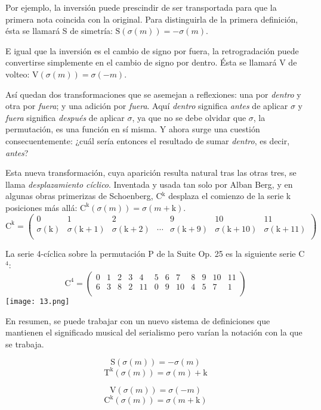 		Por ejemplo, la inversión puede prescindir de ser transportada para que la primera nota coincida con la original. Para distinguirla de la primera definición, ésta se llamará S de simetría: $\text{S}(\sigma(m)) = -\sigma(m)$.
		
		E igual que la inversión es el cambio de signo por fuera, la retrogradación puede convertirse simplemente en el cambio de signo por dentro. Ésta se llamará V de volteo: $\text{V}(\sigma(m)) = \sigma(-m)$.
		
		Así quedan dos transformaciones que se asemejan a reflexiones: una por \textit{dentro} y otra por \textit{fuera}; y una adición por \textit{fuera}. Aquí \textit{dentro} significa \textit{antes} de aplicar $\sigma$ y \textit{fuera} significa \textit{después} de aplicar $\sigma$, ya que no se debe olvidar que $\sigma$, la permutación, es una función en sí misma. Y ahora surge una cuestión consecuentemente: ¿cuál sería entonces el resultado de sumar \textit{dentro}, es decir, \textit{antes}?
		
		Esta nueva transformación, cuya aparición resulta natural tras las otras tres, se llama \textit{desplazamiento cíclico}. Inventada y usada tan solo por Alban Berg, y en algunas obras primerizas de Schoenberg, C$^\text{k}$ desplaza el comienzo de la serie k posiciones más allá: $\text{C}^\text{k}\left(\sigma\left(m\right)\right)=\sigma\left(m+\text{k}\right)$.
		$$\text{C}^\text{k}=\left(\begin{matrix}0&1&2&&9&10&11\\\sigma\left(\text{k}\right)&\sigma\left(\text{k}+1\right)&\sigma\left(\text{k}+2\right)&\cdots&\sigma\left(\text{k}+9\right)&\sigma\left(\text{k}+10\right)&\sigma\left(\text{k}+11\right)\\\end{matrix}\right)$$
		
		La serie 4-cíclica sobre la permutación P de la Suite Op. 25 es la siguiente serie C$^4$:	
		$$\text{C}^4=\left(\begin{matrix}0&1&2&3&4&5&6&7&8&9&10&11\\6&3&8&2&11&0&9&10&4&5&7&1\\\end{matrix}\right)$$		
		\texttt{[image: 13.png]}
		
		En resumen, se puede trabajar con un nuevo sistema de definiciones que mantienen el significado musical del serialismo pero varían la notación con la que se trabaja. 
		\vspace{-0.5cm}
		\begin{multicols}{2}
		$$\text{S}(\sigma(m)) = -\sigma(m)$$
		$$\text{T}^\text{k}(\sigma(m)) = \sigma(m) + \text{k}$$
		
		$$\text{V}(\sigma(m)) = \sigma(-m)$$
		$$\text{C}^\text{k}(\sigma(m))=\sigma(m+\text{k})$$
		\end{multicols}
		
